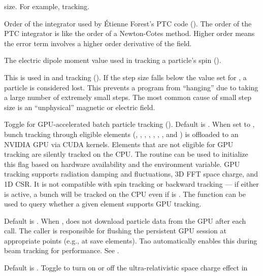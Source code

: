 {\begin{description}
size. For example,  tracking.
%
\item[\vn{default_integ_order}] \Newline
Order of the integrator used by \'Etienne Forest's PTC code ().
The order of the PTC integrator is like the order of a Newton-Cotes method.
Higher order means the error term involves a higher order derivative of the field.
%
\item[\vn{electric_dipole_moment}] \Newline
The electric dipole moment value used in tracking a particle's spin ().
%
\item[\vn{fatal_ds_adaptive_tracking}] \Newline
This is used in  and  tracking
().  If the step size falls below the value set for
, a particle is considered lost.
This prevents a program from ``hanging'' due to taking a large number
of extremely small steps. The most common cause of small step size is
an ``unphysical'' magnetic or electric field.
%
\item[\vn{gpu_tracking_on}] \Newline
Toggle for GPU-accelerated batch particle tracking (). Default is .
When set to , bunch tracking through eligible elements (, ,
, , , , , and ) is offloaded to an NVIDIA
GPU via CUDA kernels. Elements that are not eligible for GPU tracking are silently tracked on the
CPU. The  routine can be used to initialize this flag based on hardware
availability and the  environment variable. GPU tracking supports
radiation damping and fluctuations, 3D FFT space charge, and 1D CSR. It is not compatible with spin
tracking or backward tracking --- if either is active, a bunch will be tracked on the CPU even if
 is . The  function can be used to query whether
a given element supports GPU tracking.
%
\item[\vn{gpu_deferred_flush}] \Newline
Default is . When ,  does not download particle data from the
GPU after each call. The caller is responsible for flushing the persistent GPU session at appropriate
points (e.g., at save elements). Tao automatically enables this during beam tracking for performance.
See .
%
\item[\vn{high_energy_space_charge_on}] \Newline
Default is . Toggle to turn on or off the ultra-relativistic space charge effect in

\end{description}}
